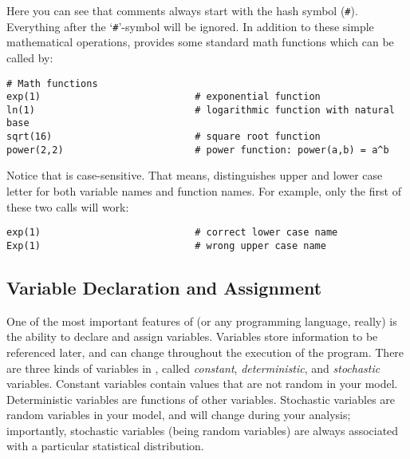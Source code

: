 Here you can see that comments always start with the hash symbol (\texttt{\#}).
Everything after the `\texttt{\#}'-symbol will be ignored.
In addition to these simple mathematical operations, \Rev provides some standard math functions which can be called by:
{\tt \begin{snugshade*}
\begin{lstlisting}    
# Math functions
exp(1)                           # exponential function
ln(1)                            # logarithmic function with natural base
sqrt(16)                         # square root function 
power(2,2)                       # power function: power(a,b) = a^b
\end{lstlisting}
\end{snugshade*}}
Notice that \Rev is case-sensitive.
That means, \Rev distinguishes upper and lower case letter for both variable names and function names.
For example, only the first of these two calls will work:
{\tt \begin{snugshade*}
\begin{lstlisting}    
exp(1)                           # correct lower case name
Exp(1)                           # wrong upper case name
\end{lstlisting}
\end{snugshade*}}

\subsection{Variable Declaration and Assignment}
One of the most important features of \RevBayes (or any programming language, really) is the ability to declare and assign variables.
Variables store information to be referenced later, and can change throughout the execution of the program.
There are three kinds of variables in \RevBayes, called \emph{constant}, \emph{deterministic}, and \emph{stochastic} variables.
Constant variables contain values that are not random in your model.
Deterministic variables are functions of other variables.
Stochastic variables are random variables in your model, and will change during your analysis; importantly, stochastic variables (being random variables) are always associated with a particular statistical distribution.

